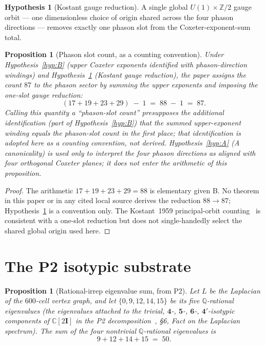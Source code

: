 \documentclass[12pt]{article}
\newtheorem{proposition}[theorem]{Proposition}
\theoremstyle{definition}
\newtheorem{hypothesis}[theorem]{Hypothesis}
\theoremstyle{remark}
\newcommand{\C}{\mathbb{C}}
\newcommand{\Q}{\mathbb{Q}}
\newcommand{\Z}{\mathbb{Z}}
\newcommand{\twoI}{2\mathbf{I}}
\begin{document}
\begin{hypothesis}[Kostant gauge reduction]\label{hyp:kostant}
A single global $U(1) \times \Z/2$ gauge orbit --- one dimensionless choice of origin shared across the four phason directions --- removes exactly one phason slot from the Coxeter-exponent-sum total.
\end{hypothesis}

\begin{proposition}[Phason slot count, as a counting convention]\label{prop:87}
Under Hypothesis~\ref{hyp:B} (upper Coxeter exponents identified with phason-direction windings) and Hypothesis~\ref{hyp:kostant} (Kostant gauge reduction), the paper assigns the count $87$ to the phason sector by summing the upper exponents and imposing the one-slot gauge reduction:
\[
  (17 + 19 + 23 + 29) \;-\; 1 \;=\; 88 \;-\; 1 \;=\; 87.
\]
Calling this quantity a ``phason-slot count'' presupposes the additional identification (part of Hypothesis~\ref{hyp:B}) that the summed upper-exponent winding equals the phason-slot count in the first place; that identification is adopted here as a counting convention, not derived. Hypothesis~\ref{hyp:A} (A canonicality) is used only to \emph{interpret} the four phason directions as aligned with four orthogonal Coxeter planes; it does not enter the arithmetic of this proposition.
\end{proposition}

\begin{proof}
The arithmetic $17 + 19 + 23 + 29 = 88$ is elementary given B. No theorem in this paper or in any cited local source derives the reduction $88 \to 87$; Hypothesis~\ref{hyp:kostant} is a convention only. The Kostant~1959 principal-orbit counting~\citep{Kostant1959} is consistent with a one-slot reduction but does not single-handedly select the shared global origin used here.
\end{proof}

\section{The P2 isotypic substrate}\label{sec:P2}

\begin{proposition}[Rational-irrep eigenvalue sum, from P2]\label{prop:50}
Let $L$ be the Laplacian of the $600$-cell vertex graph, and let $\{0, 9, 12, 14, 15\}$ be its five $\Q$-rational eigenvalues (the eigenvalues attached to the trivial, $\mathbf{4}$-, $\mathbf{5}$-, $\mathbf{6}$-, $\mathbf{4'}$-isotypic components of $\C[\twoI]$ in the P2 decomposition~\citep{CascadeAlgSubstrate}, \S 6, Fact on the Laplacian spectrum). The sum of the four nontrivial $\Q$-rational eigenvalues is
\[
  9 + 12 + 14 + 15 \;=\; 50.
\]
\end{proposition}
\end{document}
